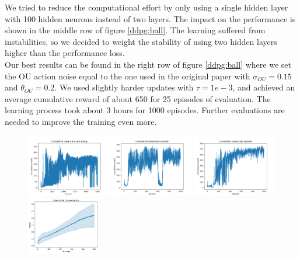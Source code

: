 We tried to reduce the computational effort by only using a single hidden layer with 100 hidden neurons instead of two layers. The impact on the performance is shown in the middle row of figure \ref{ddpg:ball}. The learning suffered from instabilities, so we decided to weight the stability of using two hidden layers higher than the performance loss.\\
Our best results can be found in the right row of figure \ref{ddpg:ball} where we set the OU action noise equal to the one used in the original paper with $\sigma_{OU}=0.15$ and $\theta_{OU}=0.2$. We used slightly harder updates with $\tau=1e-3$, and achieved an average cumulative reward of about 650 for 25 episodes of evaluation. The learning process took about 3 hours for 1000 episodes. Further evaluations are needed to improve the training even more.
\begin{figure}[H]
	\includegraphics[width=0.325\textwidth]{plots/ddpg_ball_first_train.png}
	\includegraphics[width=0.325\textwidth]{plots/ddpg_ball_1layer_train.png}
	\includegraphics[width=0.325\textwidth]{plots/ddpg_ball_best_train.png}
	\includegraphics[width=0.285\textwidth]{plots/DDPGballbalancer24-2-16.png}

\end{figure}
